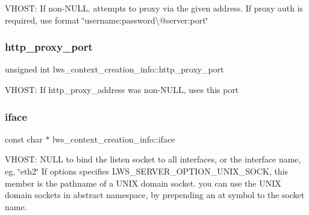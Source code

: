 V\+H\+O\+ST\+: If non-\/\+N\+U\+LL, attempts to proxy via the given address. If proxy auth is required, use format \char`\"{}username\+:password\textbackslash{}@server\+:port\char`\"{} \mbox{\label{structlws__context__creation__info_a7b59f2bdc869871e7bde232db94f5ca6}} 
\subsubsection{\texorpdfstring{http\+\_\+proxy\+\_\+port}{http\_proxy\_port}}
{\footnotesize\ttfamily unsigned int lws\+\_\+context\+\_\+creation\+\_\+info\+::http\+\_\+proxy\+\_\+port}

V\+H\+O\+ST\+: If http\+\_\+proxy\+\_\+address was non-\/\+N\+U\+LL, uses this port \mbox{\label{structlws__context__creation__info_a360147555be7a3a904be1b9cd97266d6}} 
\subsubsection{\texorpdfstring{iface}{iface}}
{\footnotesize\ttfamily const char $\ast$ lws\+\_\+context\+\_\+creation\+\_\+info\+::iface}

V\+H\+O\+ST\+: N\+U\+LL to bind the listen socket to all interfaces, or the interface name, eg, \char`\"{}eth2\char`\"{} If options specifies L\+W\+S\+\_\+\+S\+E\+R\+V\+E\+R\+\_\+\+O\+P\+T\+I\+O\+N\+\_\+\+U\+N\+I\+X\+\_\+\+S\+O\+CK, this member is the pathname of a U\+N\+IX domain socket. you can use the U\+N\+IX domain sockets in abstract namespace, by prepending an at symbol to the socket name. \mbox{\label{structlws__context__creation__info_ac34c403fd540fcf8554be6ca1396905a}} 
